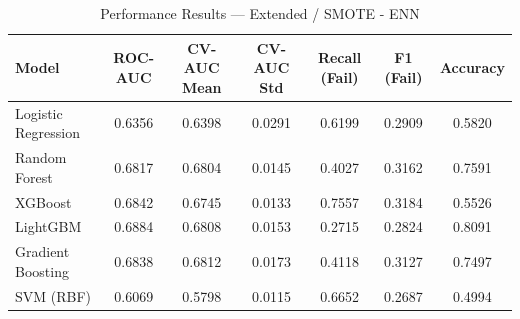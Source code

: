 \begin{table}[htbp]
\caption{Performance Results — Extended / SMOTE - ENN}
\label{tab:extended_smote_-_enn}
\begin{tabular}{lcccccc}
\toprule

Model & ROC-AUC & CV-AUC Mean & CV-AUC Std & Recall (Fail) & F1 (Fail) & Accuracy \\
\midrule

Logistic Regression & 0.6356 & 0.6398 & 0.0291 & 0.6199 & 0.2909 & 0.5820 \\
Random Forest & 0.6817 & 0.6804 & 0.0145 & 0.4027 & 0.3162 & 0.7591 \\
XGBoost & 0.6842 & 0.6745 & 0.0133 & 0.7557 & 0.3184 & 0.5526 \\
LightGBM & 0.6884 & 0.6808 & 0.0153 & 0.2715 & 0.2824 & 0.8091 \\
Gradient Boosting & 0.6838 & 0.6812 & 0.0173 & 0.4118 & 0.3127 & 0.7497 \\
SVM (RBF) & 0.6069 & 0.5798 & 0.0115 & 0.6652 & 0.2687 & 0.4994 \\
\bottomrule

\end{tabular}
\end{table}
